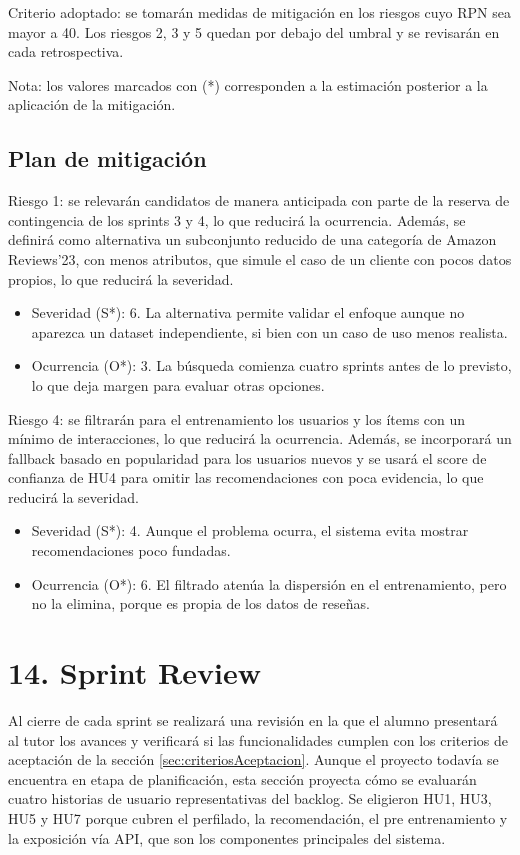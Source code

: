\documentclass[
11pt, %
]{charter}
\begin{document}
Criterio adoptado: se tomarán medidas de mitigación en los riesgos cuyo RPN sea mayor a 40. Los riesgos 2, 3 y 5 quedan por debajo del umbral y se revisarán en cada retrospectiva.

Nota: los valores marcados con (*) corresponden a la estimación posterior a la aplicación de la mitigación.

\subsection{Plan de mitigación}

Riesgo 1: se relevarán candidatos de manera anticipada con parte de la reserva de contingencia de los sprints 3 y 4, lo que reducirá la ocurrencia. Además, se definirá como alternativa un subconjunto reducido de una categoría de Amazon Reviews'23, con menos atributos, que simule el caso de un cliente con pocos datos propios, lo que reducirá la severidad.
\begin{itemize}
  \item Severidad (S*): 6. La alternativa permite validar el enfoque aunque no aparezca un dataset independiente, si bien con un caso de uso menos realista.
  \item Ocurrencia (O*): 3. La búsqueda comienza cuatro sprints antes de lo previsto, lo que deja margen para evaluar otras opciones.
\end{itemize}

Riesgo 4: se filtrarán para el entrenamiento los usuarios y los ítems con un mínimo de interacciones, lo que reducirá la ocurrencia. Además, se incorporará un fallback basado en popularidad para los usuarios nuevos y se usará el score de confianza de HU4 para omitir las recomendaciones con poca evidencia, lo que reducirá la severidad.
\begin{itemize}
  \item Severidad (S*): 4. Aunque el problema ocurra, el sistema evita mostrar recomendaciones poco fundadas.
  \item Ocurrencia (O*): 6. El filtrado atenúa la dispersión en el entrenamiento, pero no la elimina, porque es propia de los datos de reseñas.
\end{itemize}

\section{14. Sprint Review}
\label{sec:sprint_review}

Al cierre de cada sprint se realizará una revisión en la que el alumno presentará al tutor los avances y verificará si las funcionalidades cumplen con los criterios de aceptación de la sección \ref{sec:criteriosAceptacion}. Aunque el proyecto todavía se encuentra en etapa de planificación, esta sección proyecta cómo se evaluarán cuatro historias de usuario representativas del backlog. Se eligieron HU1, HU3, HU5 y HU7 porque cubren el perfilado, la recomendación, el pre entrenamiento y la exposición vía API, que son los componentes principales del sistema.
\end{document}
